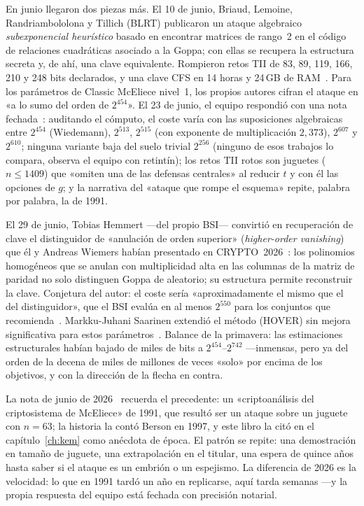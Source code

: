 \documentclass[11pt,a4paper,oneside]{report}
\begin{document}
En junio llegaron dos piezas más. El 10 de junio, Briaud, Lemoine,
Randriambololona y Tillich (BLRT) publicaron un ataque algebraico
\emph{subexponencial heurístico} basado en encontrar matrices de
rango~2 en el código de relaciones cuadráticas asociado a la Goppa;
con ellas se recupera la estructura secreta y, de ahí, una clave
equivalente. Rompieron retos TII de 83, 89, 119, 166, 210 y 248
bits declarados, y una clave CFS en 14 horas y 24\,GB de
RAM~\cite{briaud2026}. Para los parámetros de Classic McEliece
nivel~1, los propios autores cifran el ataque en «a lo sumo del
orden de $2^{454}$». El 23 de junio, el equipo respondió con una
nota fechada~\cite{cm610}: auditando el cómputo, el coste varía con
las suposiciones algebraicas entre $2^{454}$ (Wiedemann), $2^{513}$,
$2^{515}$ (con exponente de multiplicación $2{,}373$), $2^{607}$ y
$2^{610}$; ninguna variante baja del suelo trivial $2^{256}$
(ninguno de esos trabajos lo compara, observa el equipo con
retintín); los retos TII rotos son juguetes ($n\le 1409$) que
«omiten una de las defensas centrales» al reducir $t$ y con él las
opciones de $g$; y la narrativa del «ataque que rompe el esquema»
repite, palabra por palabra, la de 1991.

El 29 de junio, Tobias Hemmert ---del propio BSI--- convirtió en
recuperación de clave el distinguidor de «anulación de orden
superior» (\emph{higher-order vanishing}) que él y Andreas Wiemers
habían presentado en CRYPTO~2026~\cite{hemmert2026,hemmertwiemers2026}:
los polinomios homogéneos que se anulan con multiplicidad alta en
las columnas de la matriz de paridad no solo distinguen Goppa de
aleatorio; su estructura permite reconstruir la clave. Conjetura
del autor: el coste sería «aproximadamente el mismo que el del
distinguidor», que el BSI evalúa en al menos $2^{550}$ para los
conjuntos que recomienda~\cite{bsi2026}. Markku-Juhani Saarinen
extendió el método (HOVER) sin mejora significativa para estos
parámetros~\cite{saarinen2026hover}. Balance de la primavera: las
estimaciones estructurales habían bajado de miles de bits a
$2^{454}$--$2^{742}$ ---inmensas, pero ya del orden de la decena
de miles de millones de veces «solo» por encima de los objetivos,
y con la dirección de la flecha en contra.

\begin{historia}
La nota de junio de 2026~\cite{cm610} recuerda el precedente: un
«criptoanálisis del criptosistema de McEliece» de 1991, que resultó
ser un ataque sobre un juguete con $n=63$; la historia la contó
Berson en 1997, y este libro la citó en el capítulo~\ref{ch:kem}
como anécdota de época. El patrón se repite: una demostración en
tamaño de juguete, una extrapolación en el titular, una espera de
quince años hasta saber si el ataque es un embrión o un espejismo.
La diferencia de 2026 es la velocidad: lo que en 1991 tardó un año
en replicarse, aquí tarda semanas ---y la propia respuesta del
equipo está fechada con precisión notarial.
\end{historia}
\end{document}
